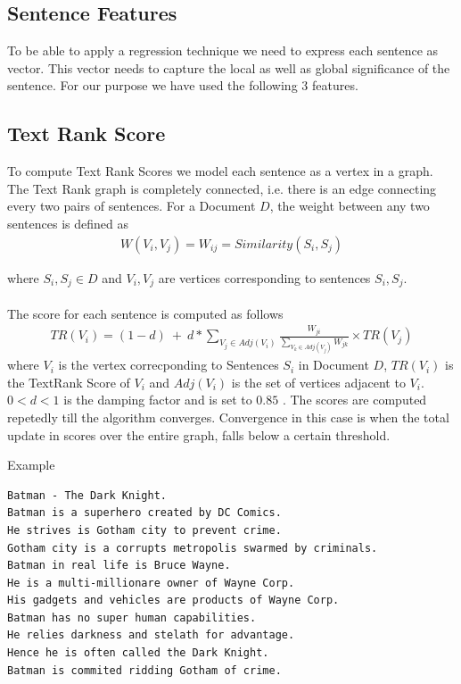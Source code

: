 \documentclass[paper=a4, fontsize=11pt]{scrartcl} %
\numberwithin{equation}{section} %
\numberwithin{figure}{section} %
\numberwithin{table}{section} %
\begin{document}
\subsection{Sentence Features}
To be able to apply a regression technique we need to express each sentence as vector. This vector needs to capture the local as well as global significance of the sentence. For our purpose we have used the following 3 features.

\subsection{Text Rank Score}
To compute Text Rank Scores \cite{textrank} we model each sentence as a vertex in a graph. The Text Rank graph is completely connected, i.e. there is an edge connecting every two pairs of sentences. For a Document $D$, the weight between any two sentences is defined as 
\begin{align}
W( V_i,V_j) = W_{ij} = Similarity(S_i,S_j)
\end{align}

where $S_i,S_j \in D$  and $V_i,V_j$ are vertices corresponding to sentences $S_i,S_j$.\\
\\
The score for each sentence is computed as follows
\begin{align}
TR(V_i) = (1 - d)\ +\ d*\sum\limits_{V_j \in Adj(V_i)} \frac{W_{ji}}{\sum\limits_{V_k \in Adj(V_j)} W_{jk}} \times TR(V_j)
\end{align}
where $V_i$ is the vertex correcponding to Sentences $S_i$ in Document $D$, $TR(V_i)$ is the TextRank Score of $V_i$ and $Adj(V_i)$ is the set of vertices adjacent to $V_i$. $0 < d < 1$ is the damping factor and is set to $0.85$ \cite{brin}. The scores are computed repetedly till the algorithm converges. Convergence in this case is when the total update in scores over the entire graph, falls below a certain threshold. \\
\par
{\large Example}
\begin{lstlisting}
Batman - The Dark Knight.
Batman is a superhero created by DC Comics.
He strives is Gotham city to prevent crime.
Gotham city is a corrupts metropolis swarmed by criminals.
Batman in real life is Bruce Wayne.
He is a multi-millionare owner of Wayne Corp.
His gadgets and vehicles are products of Wayne Corp.
Batman has no super human capabilities.
He relies darkness and stelath for advantage.
Hence he is often called the Dark Knight.
Batman is commited ridding Gotham of crime.
\end{lstlisting}  
\end{document}
